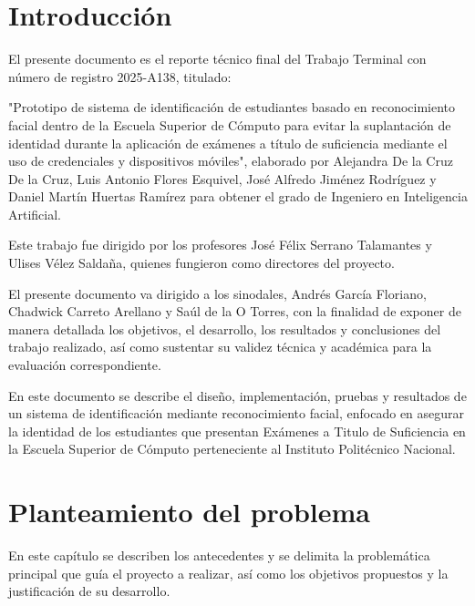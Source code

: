 

\chapter*{Introducción}

El presente documento es el reporte técnico final del Trabajo Terminal con número de registro 2025-A138, titulado:

"Prototipo de sistema de identificación de estudiantes basado en reconocimiento facial dentro de la Escuela Superior de Cómputo para evitar la suplantación de identidad durante la aplicación de exámenes a título de suficiencia mediante el uso de credenciales y dispositivos móviles", elaborado por Alejandra De la Cruz De la Cruz, Luis Antonio Flores Esquivel, José Alfredo Jiménez Rodríguez y Daniel Martín Huertas Ramírez para obtener el grado de Ingeniero en Inteligencia Artificial.

Este trabajo fue dirigido por los profesores José Félix Serrano Talamantes y Ulises Vélez Saldaña, quienes fungieron como directores del proyecto.

El presente documento va dirigido a los sinodales, Andrés García Floriano,  Chadwick Carreto Arellano y Saúl de la O Torres, con la finalidad de exponer de manera detallada los objetivos, el desarrollo, los resultados y conclusiones del trabajo realizado, así como sustentar su validez técnica y académica para la evaluación correspondiente.

En este documento se describe el diseño, implementación,  pruebas y resultados de un sistema de identificación mediante reconocimiento facial, enfocado en asegurar la identidad de los estudiantes que presentan Exámenes a Titulo de Suficiencia en la Escuela Superior de Cómputo perteneciente al Instituto Politécnico Nacional.




\chapter{Planteamiento del problema}

En este capítulo se describen los antecedentes y se delimita la problemática principal que guía el proyecto a realizar, así como los objetivos propuestos y la justificación de su desarrollo.





